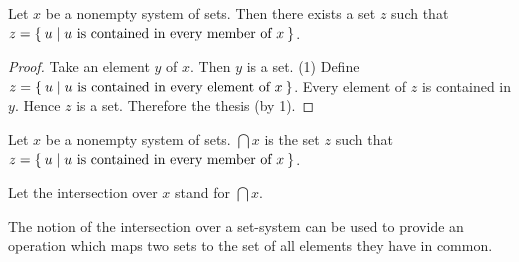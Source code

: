 \documentclass[../../set-theory.ftl.tex]{subfiles}
\begin{document}
  \begin{forthel}
    \begin{lemma}
      Let $x$ be a nonempty system of sets.
      Then there exists a set $z$ such that $z = \Set{u | \text{$u$ is contained in every member of $x$}}$.
    \end{lemma}
    \begin{proof}
      Take an element $y$ of $x$.
      Then $y$ is a set.
      (1) Define $z = \Set{u | \text{$u$ is contained in every element of $x$}}$.
      Every element of $z$ is contained in $y$.
      Hence $z$ is a set.
      Therefore the thesis (by 1).
    \end{proof}

    \begin{definition}
      Let $x$ be a nonempty system of sets.
      $\bigcap x$ is the set $z$ such that $z = \Set{u | \text{$u$ is contained in every member of $x$}}$.
    \end{definition}

    Let the intersection over $x$ stand for $\bigcap x$.
  \end{forthel}

  \noindent The notion of the intersection over a set-system can be used to
  provide an operation which maps two sets to the set of all elements they have
  in common.
\end{document}
